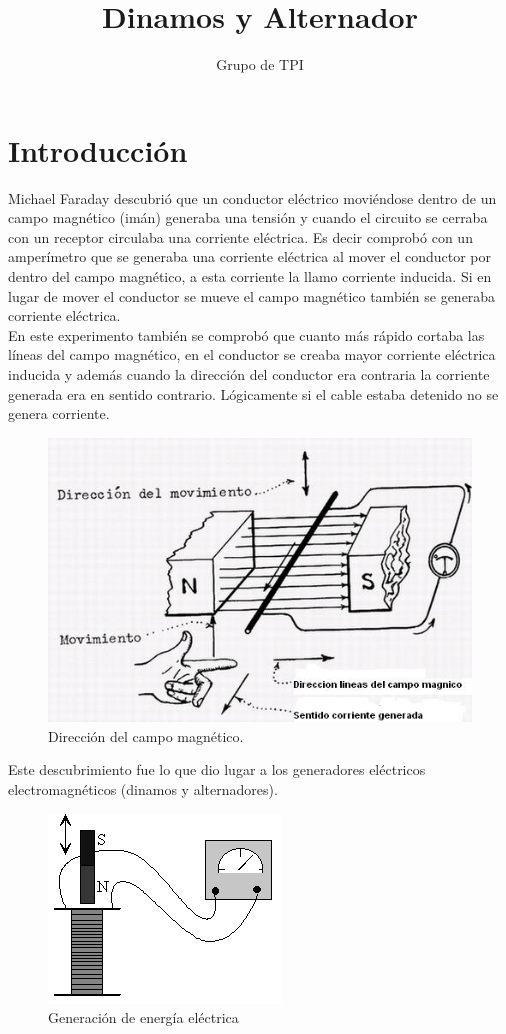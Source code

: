 \documentclass[11pt]{article}
\begin{document}
\title{\textbf{\huge Dinamos y Alternador}}
\author{Grupo de TPI}
\date{}
\maketitle

\section{Introducción}
\noindent
Michael Faraday descubrió que un conductor eléctrico moviéndose dentro de un campo magnético (imán) generaba una tensión y cuando el circuito se cerraba con un receptor circulaba una corriente eléctrica. Es decir comprobó con un amperímetro que se generaba una corriente eléctrica al mover el conductor por dentro del campo magnético, a esta corriente la llamo corriente inducida. Si en lugar de mover el conductor se mueve el campo magnético también se generaba corriente eléctrica.\\
En este experimento también se comprobó que cuanto más rápido cortaba las líneas del campo magnético, en el conductor se creaba mayor corriente eléctrica inducida y además cuando la dirección del conductor era contraria la corriente generada era en sentido contrario. Lógicamente si el cable estaba detenido no se genera corriente.
\begin{figure}[H]
  \centering
  \includegraphics[scale=0.7]{dinamo.png}
    \caption{Dirección del campo magnético.}
  \label{fig1}
\end{figure}
\noindent
Este descubrimiento fue lo que dio lugar a los generadores eléctricos electromagnéticos (dinamos y alternadores).
\begin{figure}[H]
  \centering
  \includegraphics[scale=0.7]{bobina.png}
    \caption{Generación de energía eléctrica}
  \label{fig2}
\end{figure}
\end{document}
